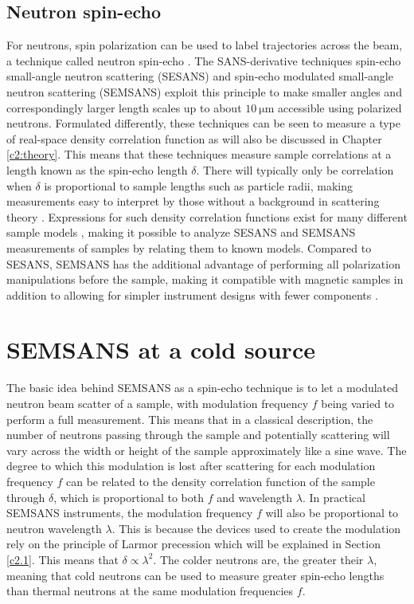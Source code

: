 \subsection{Neutron spin-echo}
For neutrons, spin polarization can be used to label trajectories across the beam, a technique called neutron spin-echo \cite{mezei1972}. The SANS-derivative techniques spin-echo small-angle neutron scattering (SESANS) \cite{rekveldt1996} and spin-echo modulated small-angle neutron scattering (SEMSANS) \cite{bouwman2009}\cite{bouwman2011} exploit this principle to make smaller angles and correspondingly larger length scales up to about $\SI{10}{\micro\meter}$ accessible using polarized neutrons. Formulated differently, these techniques can be seen to measure a type of real-space density correlation function \cite{krouglov2003} as will also be discussed in Chapter \ref{c2:theory}. This means that these techniques measure sample correlations at a length known as the spin-echo length $\delta$. There will typically only be correlation when $\delta$ is proportional to sample lengths such as particle radii, making measurements easy to interpret by those without a background in scattering theory \cite{bouwman2021}. Expressions for such density correlation functions exist for many different sample models \cite{andersson2008}, making it possible to analyze SESANS and SEMSANS measurements of samples by relating them to known models. Compared to SESANS, SEMSANS has the additional advantage of performing all polarization manipulations before the sample, making it compatible with magnetic samples \cite{li2021} in addition to allowing for simpler instrument designs with fewer components \cite{bouwman2009}.

\section{SEMSANS at a cold source}
\label{c1.2}

The basic idea behind SEMSANS as a spin-echo technique is to let a modulated neutron beam scatter of a sample, with modulation frequency $f$ being varied to perform a full measurement. This means that in a classical description, the number of neutrons passing through the sample and potentially scattering will vary across the width or height of the sample approximately like a sine wave. The degree to which this modulation is lost after scattering for each modulation frequency $f$ can be related to the density correlation function of the sample through $\delta$, which is proportional to both $f$ and wavelength $\lambda$. In practical SEMSANS instruments, the modulation frequency $f$ will also be proportional to neutron wavelength $\lambda$. This is because the devices used to create the modulation rely on the principle of Larmor precession which will be explained in Section \ref{c2.1}. This means that $\delta\propto\lambda^2$. The colder neutrons are, the greater their $\lambda$, meaning that cold neutrons can be used to measure greater spin-echo lengths than thermal neutrons at the same modulation frequencies $f$. 

